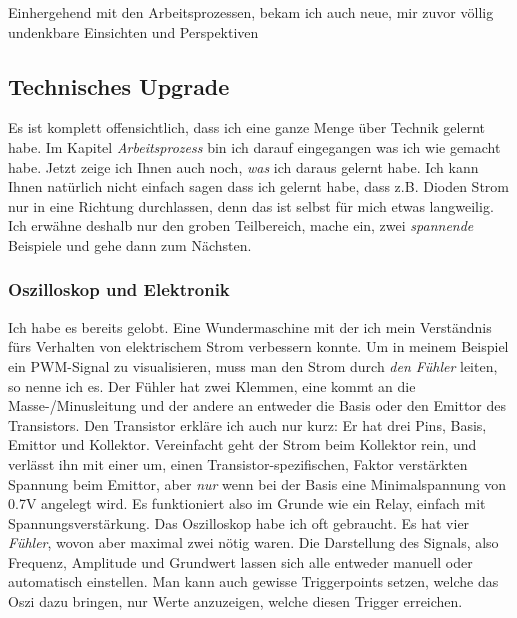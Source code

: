 \documentclass[12pt,titlepage,a4paper]{article}
\begin{document}
Einhergehend mit den Arbeitsprozessen, bekam ich auch neue, mir zuvor völlig undenkbare Einsichten und Perspektiven 
\subsection{Technisches Upgrade}
Es ist komplett offensichtlich, dass ich eine ganze Menge über Technik gelernt habe. Im Kapitel \textit{Arbeitsprozess} bin ich darauf eingegangen was ich wie gemacht habe. Jetzt zeige ich Ihnen auch noch, \textit{was} ich daraus gelernt habe. Ich kann Ihnen natürlich nicht einfach sagen dass ich gelernt habe, dass z.B. Dioden Strom nur in eine Richtung durchlassen, denn das ist selbst für mich etwas langweilig. Ich erwähne deshalb nur den groben Teilbereich, mache ein, zwei \textit{spannende} Beispiele und gehe dann zum Nächsten.
\subsubsection{Oszilloskop und Elektronik}
Ich habe es bereits gelobt. Eine Wundermaschine mit der ich mein Verständnis fürs Verhalten von elektrischem Strom verbessern konnte. Um in meinem Beispiel ein PWM-Signal zu visualisieren, muss man den Strom durch \textit{den Fühler} leiten, so nenne ich es. Der Fühler hat zwei Klemmen, eine kommt an die Masse-/Minusleitung und der andere an entweder die Basis oder den Emittor des Transistors. Den Transistor erkläre ich auch nur kurz: Er hat drei Pins, Basis, Emittor und Kollektor. Vereinfacht geht der Strom beim Kollektor rein, und verlässt ihn mit einer um, einen Transistor-spezifischen, Faktor verstärkten Spannung beim Emittor, aber \textit{nur} wenn bei der Basis eine Minimalspannung von 0.7V angelegt wird. Es funktioniert also im Grunde wie ein Relay, einfach mit Spannungsverstärkung. Das Oszilloskop habe ich oft gebraucht. Es hat vier \textit{Fühler}, wovon aber maximal zwei nötig waren. Die Darstellung des Signals, also Frequenz, Amplitude und Grundwert lassen sich alle entweder manuell oder automatisch einstellen. Man kann auch gewisse Triggerpoints setzen, welche das Oszi dazu bringen, nur Werte anzuzeigen, welche diesen Trigger erreichen.
\end{document}

